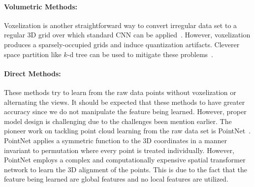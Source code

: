 \paragraph{Volumetric Methods:}
Voxelization is another straightforward way to convert irregular data set to a regular 3D grid over which standard CNN can be applied~\citep{maturana2015voxnet}. However, voxelization produces a sparsely-occupied grids and induce quantization artifacts. Cleverer space partition like $k$-d tree can be used to mitigate these problems~\citep{klokov2017escape}.
\paragraph{Direct Methods:}
These methods try to learn from the raw data points without voxelization or alternating the views. It should be expected that these methods to have greater accuracy since we do not manipulate the feature being learned. However, proper model design is challenging due to the challenges been mention earlier. The pioneer work on tackling point cloud learning from the raw data set is PointNet~\citep{pointnet}. PointNet applies a symmetric function to the 3D coordinates in a manner invariant to permutation where every point is treated individually. However, PointNet employs a complex and computationally expensive spatial transformer network to learn the 3D alignment of the points. This is due to the fact that the feature being learned are global features and no local features are utilized.  